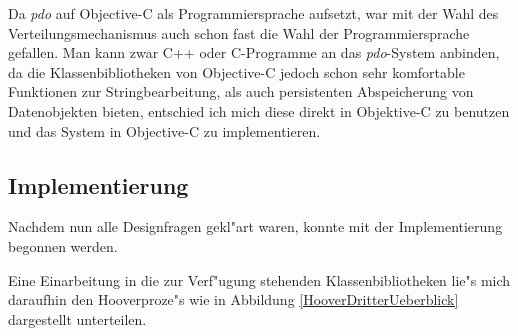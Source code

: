 Da {\em pdo} auf Objective-C als Programmiersprache aufsetzt, war mit der Wahl des Verteilungsmechanismus auch schon fast die Wahl der Programmiersprache gefallen. Man kann zwar C{\small ++} oder C-Programme an das {\em pdo}-System anbinden, da die Klassenbibliotheken von Objective-C jedoch schon sehr komfortable Funktionen zur Stringbearbeitung, als auch persistenten Abspeicherung von Datenobjekten bieten, entschied ich mich diese direkt in Objektive-C zu benutzen und das System in Objective-C zu implementieren.


\subsection{Implementierung}

Nachdem nun alle Designfragen gekl"art waren, konnte mit der Implementierung begonnen werden.

Eine Einarbeitung in die zur Verf"ugung stehenden Klassenbibliotheken lie"s mich daraufhin den Hooverproze"s wie in Abbildung \ref{HooverDritterUeberblick} dargestellt unterteilen.

